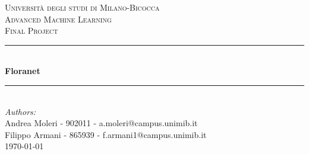 \begin{titlepage}

\newcommand{\HRule}{\rule{\linewidth}{0.5mm}} %

\center %
 

\textsc{\LARGE Università degli studi di Milano-Bicocca}\\[1cm] %
\textsc{\Large Advanced Machine Learning }\\[0.3cm] %
\textsc{\large Final Project}\\[0.1cm] %


\HRule \\[0.4cm]
{ \huge \bfseries Floranet}\\[0.4cm] %
\HRule \\[1.5cm]
 

\large
\emph{Authors:}\\
Andrea Moleri - 902011 - a.moleri@campus.unimib.it \\   %
Filippo Armani - 865939 - f.armani1@campus.unimib.it   \\[1cm] %



{\large \today}\\[2cm] %


\end{titlepage}
